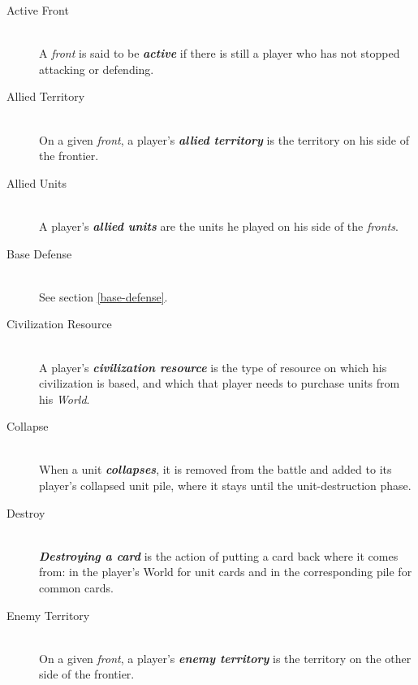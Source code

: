 \documentclass[a4paper]{article}
\begin{document}
    \begin{description}
        \item[Active Front] \hfill \\
            A \textit{front} is said to be \textbf{\textit{active}} if there is still a player
            who has not stopped attacking or defending.
            
        \item[Allied Territory] \hfill \\
            On a given \textit{front}, a player's \textbf{\textit{allied territory}}
            is the territory on his side of the frontier.
            
        \item[Allied Units] \hfill \\
            A player's \textbf{\textit{allied units}} are the units he played on his side
            of the \textit{fronts}.
            
        \item[Base Defense] \hfill \\
            See section \ref{base-defense}.
            
        \item[Civilization Resource] \hfill \\
            A player's \textbf{\textit{civilization resource}} is the type of resource
            on which his civilization is based, and which that player needs to purchase
            units from his \textit{World}.
            
        \item[Collapse] \hfill \\
            When a unit \textbf{\textit{collapses}},
            it is removed from the battle and added to its player's collapsed unit pile,
            where it stays until the unit-destruction phase.
            
        \item[Destroy] \hfill \\
            \textbf{\textit{Destroying a card}} is the action of putting a card back
            where it comes from: in the player's World for unit cards and
            in the corresponding pile for common cards.
            
        \item[Enemy Territory] \hfill \\
            On a given \textit{front}, a player's \textbf{\textit{enemy territory}}
            is the territory on the other side of the frontier.
            

\end{description}
\end{document}
